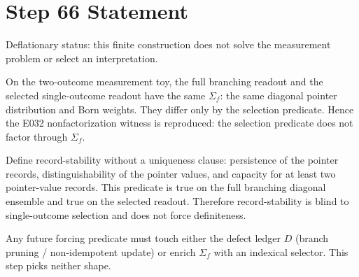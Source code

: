 \documentclass[11pt]{article}
\begin{document}
\section*{Step 66 Statement}
Deflationary status: this finite construction does not solve the measurement problem or select an interpretation.

On the two-outcome measurement toy, the full branching readout and the selected single-outcome readout have the same \(\Sigma_f\): the same diagonal pointer distribution and Born weights. They differ only by the selection predicate. Hence the E032 nonfactorization witness is reproduced: the selection predicate does not factor through \(\Sigma_f\).

Define record-stability without a uniqueness clause: persistence of the pointer records, distinguishability of the pointer values, and capacity for at least two pointer-value records. This predicate is true on the full branching diagonal ensemble and true on the selected readout. Therefore record-stability is blind to single-outcome selection and does not force definiteness.

Any future forcing predicate must touch either the defect ledger \(D\) (branch pruning / non-idempotent update) or enrich \(\Sigma_f\) with an indexical selector. This step picks neither shape.
\end{document}
